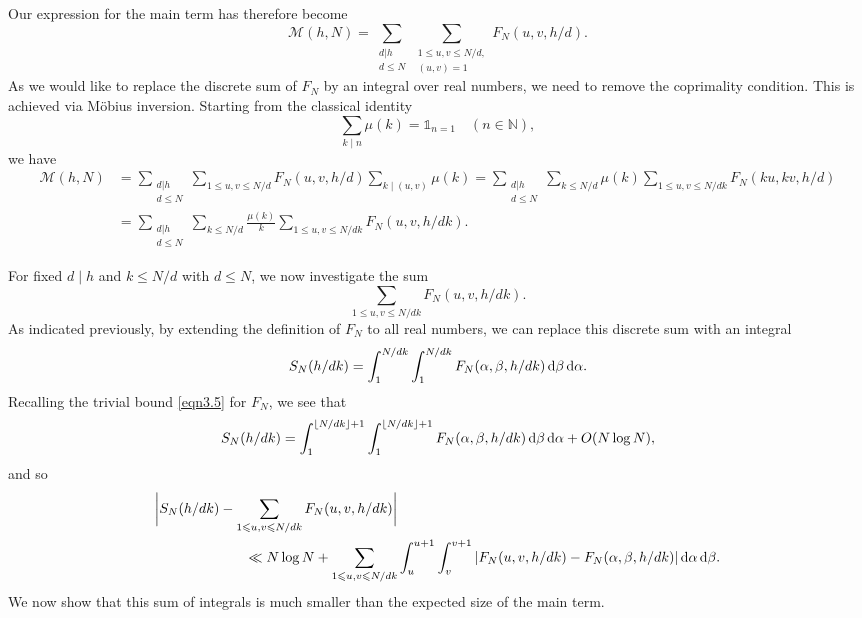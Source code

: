 \documentclass[12pt,reqno]{amsart}
\theoremstyle{definition}
\theoremstyle{remark}
\numberwithin{equation}{section}
\renewcommand{\leq}{\leqslant}
\def \cM {\mathcal M}
\def \N {\mathbb{N}}
\def\d{{\,{\rm d}}}
\newcommand\1{\mathds{1}}
\begin{document}
Our expression for the main term has therefore become
\begin{equation*}
     \cM(h,N)=\sum_{\substack{d|h \\ d \leqslant N}} \sum_{\substack{1 \leq u,v \leq N/d,\\ (u,v) = 1}} F_N(u,v,h/d) .
\end{equation*}
As we would like to replace the discrete sum of $F_N$ by an integral over real numbers, we need to remove the coprimality condition. This is achieved via M\"{o}bius inversion. Starting from the classical identity
\begin{equation*}
    \sum_{k\mid n}\mu(k) = \1_{n=1} \quad (n\in\N),
\end{equation*}
we have
\begin{align*}
    \cM(h,N)&=\sum_{\substack{d|h \\ d \leqslant N}} \sum_{1 \leq u,v \leq N/d} F_N(u,v,h/d)\sum_{k\mid (u,v)}\mu(k) =  \sum_{\substack{d|h \\ d \leqslant N}} \sum_{k\leqslant N/d}\mu(k)\sum_{1\leqslant u,v\leqslant N/dk}F_N(ku,kv,h/d)\\
    &= \sum_{\substack{d|h \\ d \leqslant N}} \sum_{k\leqslant N/d}\frac{\mu(k)}{k}\sum_{1\leqslant u,v\leqslant N/dk}F_N(u,v,h/dk).
\end{align*}

For fixed $d\mid h$ and $k\leqslant N/d$ with $d\leqslant N$, we now investigate the sum
\begin{equation*}
    \sum_{1\leqslant u,v\leqslant N/dk}F_N(u,v,h/dk).
\end{equation*}
As indicated previously, by extending the definition of $F_N$ to all real numbers, we can replace this discrete sum with an integral
\begin{equation*}
   S_N(h/dk)= \int_1^{N/dk} \int_1^{N/dk} F_N(\alpha, \beta, h/dk)  \d \beta \d \alpha .
\end{equation*}
Recalling the trivial bound \eqref{eqn3.5} for $F_N$, we see that
\begin{equation*}
    S_N(h/dk) = \int_1^{\lfloor N/dk \rfloor + 1} \int_1^{\lfloor N/dk \rfloor + 1} F_N(\alpha, \beta, h/dk)  \d \beta \d \alpha  + O(N\log N),
\end{equation*}
and so
\begin{align*}
    \bigg\lvert S_N(h/dk)-\sum_{1\leqslant u,v\leqslant N/dk}F_N(u,v,h/dk) \bigg\rvert & \\ \ll N\log N+\sum_{1 \leq u,v \leq N/dk} & \int_{u}^{u+1} \int_{v}^{v+1} |  F_N(u,v,h/dk) -   F_N(\alpha, \beta, h/dk) |  \d \alpha \d \beta.
\end{align*}
We now show that this sum of integrals is much smaller than the expected size of the main term.
\end{document}
